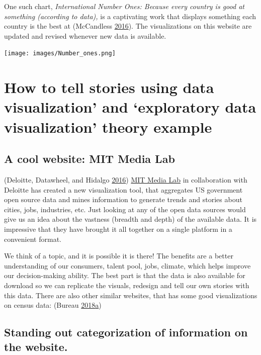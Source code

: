 \documentclass[]{book}
\begin{document}
One such chart, \emph{International Number Ones: Because every country is good at something (according to data),} is a captivating work that displays something each country is the best at (McCandless \protect\hyperlink{ref-country_chart}{2016}). The visualizations on this website are updated and revised whenever new data is available.

\texttt{[image: images/Number\_ones.png]}

\hypertarget{how-to-tell-stories-using-data-visualization-and-exploratory-data-visualization-theory-example}{%
\section{How to tell stories using data visualization' and `exploratory data visualization' theory example}\label{how-to-tell-stories-using-data-visualization-and-exploratory-data-visualization-theory-example}}

\hypertarget{a-cool-website-mit-media-lab}{%
\subsection{A cool website: MIT Media Lab}\label{a-cool-website-mit-media-lab}}

(Deloitte, Datawheel, and Hidalgo \protect\hyperlink{ref-DataUSA}{2016})
\href{https://www.media.mit.edu}{MIT Media Lab} in collaboration with Deloitte has created a new visualization tool, that aggregates US government open source data and mines information to generate trends and stories about cities, jobs, industries, etc.
Just looking at any of the open data sources would give us an idea about the vastness (breadth and depth) of the available data. It is impressive that they have brought it all together on a single platform in a convenient format.

We think of a topic, and it is possible it is there! The benefits are a better understanding of our consumers, talent pool, jobs, climate, which helps improve our decision-making ability. The best part is that the data is also available for download so we can replicate the visuals, redesign and tell our own stories with this data.
There are also other similar websites, that has some good visualizations on census data: (Bureau \protect\hyperlink{ref-CensusDataViz}{2018}\protect\hyperlink{ref-CensusDataViz}{a})

\hypertarget{standing-out-categorization-of-information-on-the-website.}{%
\subsection{Standing out categorization of information on the website.}\label{standing-out-categorization-of-information-on-the-website.}}
\end{document}
